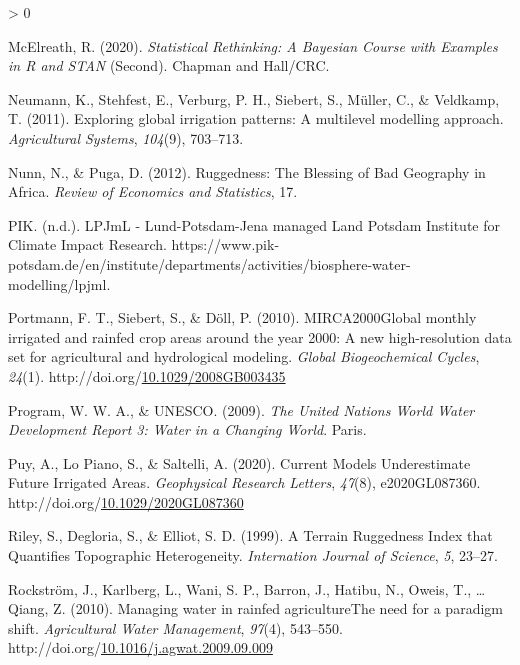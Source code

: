 \documentclass[12pt,twoside]{reedthesis}
\newlength{\cslhangindent}
\newenvironment{CSLReferences}[2] %
 {%
  \setlength{\parindent}{0pt}
  \ifodd #1 \everypar{\setlength{\hangindent}{\cslhangindent}}\ignorespaces\fi
  \ifnum #2 > 0
  \setlength{\parskip}{#2\baselineskip}
  \fi
 }%
 {}
\begin{document}
\begin{CSLReferences}{1}{0}
\leavevmode\hypertarget{ref-mcelreathStatisticalRethinkingBayesian2020}{}%
McElreath, R. (2020). \emph{Statistical {Rethinking}: A {Bayesian Course} with {Examples} in {R} and {STAN}} (Second). {Chapman and Hall/CRC}.

\leavevmode\hypertarget{ref-neumannExploringGlobalIrrigation2011}{}%
Neumann, K., Stehfest, E., Verburg, P. H., Siebert, S., Müller, C., \& Veldkamp, T. (2011). Exploring global irrigation patterns: A multilevel modelling approach. \emph{Agricultural Systems}, \emph{104}(9), 703--713.

\leavevmode\hypertarget{ref-nunnRuggednessBlessingBad2012}{}%
Nunn, N., \& Puga, D. (2012). Ruggedness: The {Blessing} of {Bad Geography} in {Africa}. \emph{Review of Economics and Statistics}, 17.

\leavevmode\hypertarget{ref-pikLPJmLLundPotsdamJenaManaged}{}%
PIK. (n.d.). {LPJmL} - {Lund}-{Potsdam}-{Jena} managed {Land} {} {Potsdam Institute} for {Climate Impact Research}. https://www.pik-potsdam.de/en/institute/departments/activities/biosphere-water-modelling/lpjml.

\leavevmode\hypertarget{ref-portmannMIRCA2000GlobalMonthly2010a}{}%
Portmann, F. T., Siebert, S., \& Döll, P. (2010). {MIRCA2000}{{Global}} monthly irrigated and rainfed crop areas around the year 2000: A new high-resolution data set for agricultural and hydrological modeling. \emph{Global Biogeochemical Cycles}, \emph{24}(1). http://doi.org/\href{https://doi.org/10.1029/2008GB003435}{10.1029/2008GB003435}

\leavevmode\hypertarget{ref-worldwaterassesnentprogramUnitedNationsWorld2009}{}%
Program, W. W. A., \& UNESCO. (2009). \emph{The {United Nations World Water Development Report} 3: Water in a {Changing World}}. {Paris}.

\leavevmode\hypertarget{ref-puyCurrentModelsUnderestimate2020}{}%
Puy, A., Lo Piano, S., \& Saltelli, A. (2020). Current {Models Underestimate Future Irrigated Areas}. \emph{Geophysical Research Letters}, \emph{47}(8), e2020GL087360. http://doi.org/\href{https://doi.org/10.1029/2020GL087360}{10.1029/2020GL087360}

\leavevmode\hypertarget{ref-rileyTerrainRuggednessIndex1999}{}%
Riley, S., Degloria, S., \& Elliot, S. D. (1999). A {Terrain Ruggedness Index} that {Quantifies Topographic Heterogeneity}. \emph{Internation Journal of Science}, \emph{5}, 23--27.

\leavevmode\hypertarget{ref-rockstromManagingWaterRainfed2010}{}%
Rockström, J., Karlberg, L., Wani, S. P., Barron, J., Hatibu, N., Oweis, T., \ldots{} Qiang, Z. (2010). Managing water in rainfed agriculture{{The}} need for a paradigm shift. \emph{Agricultural Water Management}, \emph{97}(4), 543--550. http://doi.org/\href{https://doi.org/10.1016/j.agwat.2009.09.009}{10.1016/j.agwat.2009.09.009}


\end{CSLReferences}
\end{document}
